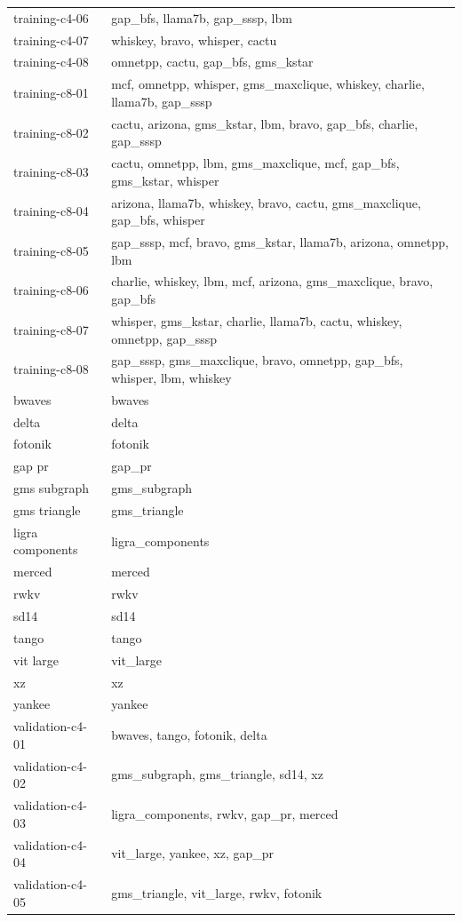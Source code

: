 \begin{tabular}{ll}
training-c4-06 & gap\_bfs, llama7b, gap\_sssp, lbm \\
training-c4-07 & whiskey, bravo, whisper, cactu \\
training-c4-08 & omnetpp, cactu, gap\_bfs, gms\_kstar \\
training-c8-01 & mcf, omnetpp, whisper, gms\_maxclique, whiskey, charlie, llama7b, gap\_sssp \\
training-c8-02 & cactu, arizona, gms\_kstar, lbm, bravo, gap\_bfs, charlie, gap\_sssp \\
training-c8-03 & cactu, omnetpp, lbm, gms\_maxclique, mcf, gap\_bfs, gms\_kstar, whisper \\
training-c8-04 & arizona, llama7b, whiskey, bravo, cactu, gms\_maxclique, gap\_bfs, whisper \\
training-c8-05 & gap\_sssp, mcf, bravo, gms\_kstar, llama7b, arizona, omnetpp, lbm \\
training-c8-06 & charlie, whiskey, lbm, mcf, arizona, gms\_maxclique, bravo, gap\_bfs \\
training-c8-07 & whisper, gms\_kstar, charlie, llama7b, cactu, whiskey, omnetpp, gap\_sssp \\
training-c8-08 & gap\_sssp, gms\_maxclique, bravo, omnetpp, gap\_bfs, whisper, lbm, whiskey \\
bwaves & bwaves \\
delta & delta \\
fotonik & fotonik \\
gap pr & gap\_pr \\
gms subgraph & gms\_subgraph \\
gms triangle & gms\_triangle \\
ligra components & ligra\_components \\
merced & merced \\
rwkv & rwkv \\
sd14 & sd14 \\
tango & tango \\
vit large & vit\_large \\
xz & xz \\
yankee & yankee \\
validation-c4-01 & bwaves, tango, fotonik, delta \\
validation-c4-02 & gms\_subgraph, gms\_triangle, sd14, xz \\
validation-c4-03 & ligra\_components, rwkv, gap\_pr, merced \\
validation-c4-04 & vit\_large, yankee, xz, gap\_pr \\
validation-c4-05 & gms\_triangle, vit\_large, rwkv, fotonik \\

\end{tabular}

